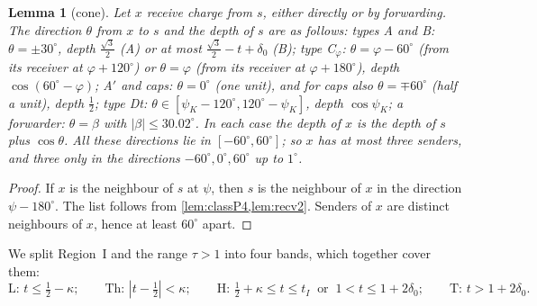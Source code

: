 \documentclass[11pt]{amsart}
\newtheorem{lemma}[theorem]{Lemma}
\theoremstyle{definition}
\theoremstyle{remark}
\begin{document}
\begin{lemma}[cone]\label{lem:cone}
Let $x$ receive charge from $s$, either directly or by forwarding. The direction $\theta$ from $x$ to $s$ and the depth of $s$ are as follows: types A and B: $\theta=\pm30^\circ$, depth $\frac{\sqrt3}2$ (A) or at most $\frac{\sqrt3}2-t+\delta_0$ (B); type C$_\varphi$: $\theta=\varphi-60^\circ$ (from its receiver at $\varphi+120^\circ$) or $\theta=\varphi$ (from its receiver at $\varphi+180^\circ$), depth $\cos(60^\circ-\varphi)$; A$'$ and caps: $\theta=0^\circ$ (one unit), and for caps also $\theta=\mp60^\circ$ (half a unit), depth $\frac12$; type Dt: $\theta\in[\psi_K-120^\circ,120^\circ-\psi_K]$, depth $\cos\psi_K$; a forwarder: $\theta=\beta$ with $|\beta|\le30.02^\circ$. In each case the depth of $x$ is the depth of $s$ plus $\cos\theta$. All these directions lie in $[-60^\circ,60^\circ]$; so $x$ has at most three senders, and three only in the directions $-60^\circ,0^\circ,60^\circ$ up to $1^\circ$.
\end{lemma}
\begin{proof}
If $x$ is the neighbour of $s$ at $\psi$, then $s$ is the neighbour of $x$ in the direction $\psi-180^\circ$. The list follows from \cref{lem:classP4,lem:recv2}. Senders of $x$ are distinct neighbours of $x$, hence at least $60^\circ$ apart.
\end{proof}

We split Region~I and the range $\tau>1$ into four bands, which together cover them:
\[
\text{L: } t\le\tfrac12-\kappa;\qquad \text{Th: } |t-\tfrac12|<\kappa;\qquad \text{H: } \tfrac12+\kappa\le t\le t_I\ \text{ or }\ 1<t\le1+2\delta_0;\qquad \text{T: } t>1+2\delta_0 .
\]
\end{document}
